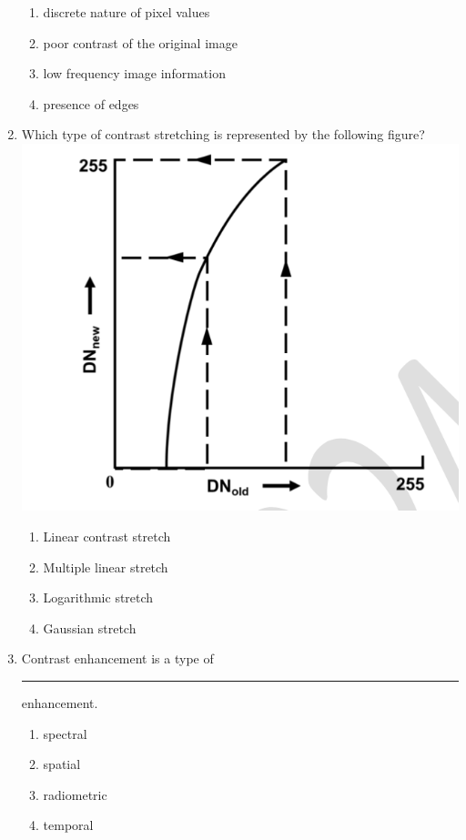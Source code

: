 \documentclass[12pt]{article}
\begin{document}
\begin{enumerate}
\begin{enumerate}
    \item discrete nature of pixel values 
   \item poor contrast of the original image 
   \item low frequency image information 
   \item presence of edges
\end{enumerate}


\item Which type of contrast stretching is represented by the following figure?  \\

\includegraphics[scale = 0.6]{Figs/LatexImage8.png}  \\

\begin{enumerate}
    \item Linear contrast stretch 
   \item Multiple linear stretch 
   \item Logarithmic stretch 
   \item Gaussian stretch
\end{enumerate}

\item Contrast enhancement is a type of \rule{2cm}{0.15mm} enhancement.
\begin{enumerate}
    \item spectral 
   \item spatial 
   \item radiometric 
   \item temporal
\end{enumerate}


\end{enumerate}
\end{document}
